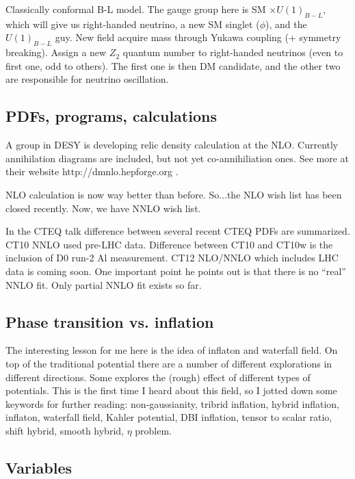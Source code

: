 \documentclass{fheadnote}
\begin{document}
Classically conformal B-L model.  The gauge group here is SM $\times U(1)_{B-L}$,
which will give us right-handed neutrino, a new SM singlet ($\phi$), and the $U(1)_{B-L}$ guy.
New field acquire mass through Yukawa coupling (+ symmetry breaking).
Assign a new $Z_2$ quantum number to right-handed neutrinos (even to first one, odd to others).
The first one is then DM candidate, and the other two are responsible for neutrino oscillation.

\subsection{PDFs, programs, calculations}

A group in DESY is developing relic density calculation at the NLO.
Currently annihilation diagrams are included, but not yet co-annihiliation ones.
See more at their website http://dmnlo.hepforge.org .

NLO calculation is now way better than before.
So...the NLO wish list has been closed recently.
Now, we have NNLO wish list.

In the CTEQ talk difference between several recent CTEQ PDFs are summarized.
CT10 NNLO used pre-LHC data.  Difference between CT10 and CT10w is the inclusion of D0 run-2 Al measurement.
CT12 NLO/NNLO which includes LHC data is coming soon.
One important point he points out is that there is no ``real'' NNLO fit.
Only partial NNLO fit exists so far.


\subsection{Phase transition vs. inflation}

The interesting lesson for me here is the idea of inflaton and waterfall field.
On top of the traditional potential there are a number of different explorations in different directions.
Some explores the (rough) effect of different types of potentials.
This is the first time I heard about this field, so I jotted down some keywords for further reading:
non-gaussianity, tribrid inflation, hybrid inflation, inflaton, waterfall field, Kahler potential,
DBI inflation, tensor to scalar ratio, shift hybrid, smooth hybrid, $\eta$ problem.

\subsection{Variables}
\end{document}
